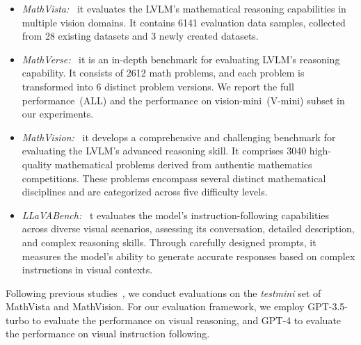 \begin{itemize}
    \item \textit{MathVista:}~\citep{lu2023mathvista} it evaluates the LVLM's mathematical reasoning capabilities in multiple vision domains. It contains 6141 evaluation data samples, collected from 28 existing datasets and 3 newly created datasets. 
    \item \textit{MathVerse:}~\citep{zhang2025mathverse} it is an in-depth benchmark for evaluating LVLM's reasoning capability. It consists of 2612 math problems, and each problem is transformed into 6 distinct problem versions. We report the full performance~(ALL) and the performance on vision-mini~(V-mini) subset in our experiments. 
    \item \textit{MathVision:}~\citep{wang2024measuring} it develops a comprehensive and challenging benchmark for 
    evaluating the LVLM's advanced reasoning skill. It comprises 3040 high-quality mathematical problems derived from authentic mathematics competitions. These problems encompass several distinct mathematical disciplines and are categorized across five difficulty levels.
    
    \item \textit{LLaVABench:}~\citep{liu2024visual} t evaluates the model's instruction-following capabilities across diverse visual scenarios, assessing its conversation, detailed description, and complex reasoning skills. Through carefully designed prompts, it measures the model's ability to generate accurate responses based on complex instructions in visual contexts.

\end{itemize}

Following previous studies~\cite{zhang2024internlm,li2024llava}, we conduct evaluations on the {\emph{testmini}} set of MathVista and MathVision. For our evaluation framework, we employ GPT-3.5-turbo to evaluate the performance on visual reasoning, and GPT-4 to evaluate the performance on visual instruction following.


